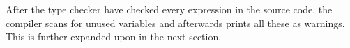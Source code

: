 After the type checker have checked every expression in the source code, the compiler scans for unused variables and afterwards prints all these as warnings.
This is further expanded upon in the next section.
